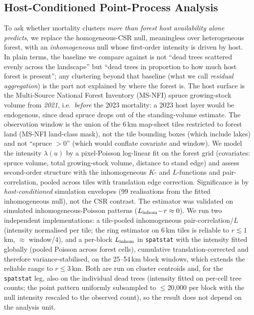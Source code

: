 \documentclass[twocolumn]{article}
\begin{document}
\subsection{Host-Conditioned Point-Process Analysis}
\label{sec:methods-host}

To ask whether mortality clusters \emph{more than forest host availability alone predicts}, we
replace the homogeneous-CSR null, meaningless over heterogeneous forest, with an
\emph{inhomogeneous} null whose first-order intensity is driven by host. In plain terms, the baseline
we compare against is not ``dead trees scattered evenly across the landscape'' but ``dead trees in
proportion to how much host forest is present''; any clustering beyond that baseline (what we call
\emph{residual aggregation}) is the part not explained by where the forest is. The host surface is the
Multi-Source National Forest Inventory (MS-NFI) spruce growing-stock volume from \emph{2021}, i.e.\
\emph{before} the 2023 mortality: a 2023 host layer would be endogenous, since dead spruce drops out
of the standing-volume estimate. The observation window is the union of the 6\,km map-sheet tiles
restricted to forest land (MS-NFI land-class mask), not the tile bounding boxes (which include
lakes) and not ``spruce $>0$'' (which would conflate covariate and window). We model the intensity
$\lambda(u)$ by a pixel-Poisson log-linear fit on the forest grid (covariates: spruce volume, total
growing-stock volume, distance to stand edge) and assess second-order structure with the
inhomogeneous $K$- and $L$-functions and pair-correlation, pooled across tiles with translation edge
correction. Significance is by \emph{host-conditioned} simulation envelopes (99 realisations from the
fitted inhomogeneous null), not the CSR contrast. The estimator was validated on simulated
inhomogeneous-Poisson patterns ($L_{\rm inhom}\!-\!r\approx0$). We run two independent
implementations: a tile-pooled inhomogeneous pair-correlation/$L$ (intensity normalised per tile;
the ring estimator on 6\,km tiles is reliable to $r\lesssim1$\,km, $\approx$ window/4), and a
per-block $L_{\rm inhom}$ in \texttt{spatstat} with the intensity fitted globally (pooled Poisson
across forest cells), cumulative translation-corrected and therefore variance-stabilised, on the
25--54\,km block windows, which extends the reliable range to $r\le3$\,km. Both are run on cluster
centroids and, for the \texttt{spatstat} leg, also on the individual dead trees (intensity fitted on
per-cell tree counts; the point pattern uniformly subsampled to $\le$20{,}000 per block with the null
intensity rescaled to the observed count), so the result does not depend on the analysis unit.
\end{document}
